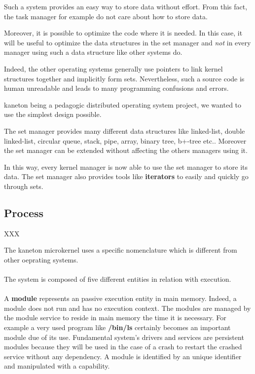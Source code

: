 \documentclass[10pt,a4wide]{article}
\begin{document}
\begin{multicols}{2}
Such a system provides an easy way to store data without effort. From this
fact, the task manager for example do not care about how to store data.

Moreover, it is possible to optimize the code where it is needed. In this
case, it will be useful to optimize the data structures in the set manager
and \textit{not} in every manager using such a data structure like
other systems do.

Indeed, the other operating systems generally use pointers to link kernel
structures together and implicitly form sets. Nevertheless, such a source code
is human unreadable and leads to many programming confusions and errors.

kaneton being a pedagogic distributed operating system project, we wanted
to use the simplest design possible.

The set manager provides many different data structures like linked-list,
double linked-list, circular queue, stack, pipe, array, binary tree, b+-tree
etc.. Moreover the set manager can be extended without affecting the others
managers using it.

In this way, every kernel manager is now able to use the set manager to
store its data. The set manager also provides tools like \textbf{iterators}
to easily and quickly go through sets.

\subsection{Process}

XXX

The kaneton microkernel uses a specific nomenclature which is different
from other oeprating systems.

\paragraph{}

The system is composed of five different entities in relation with execution.

\paragraph{}

A \textbf{module} represents an passive execution entity in main memory.
Indeed, a module does not run and has no execution context. The modules are
managed by the module service to reside in main memory the time it is
necessary. For example a very used program like \textbf{/bin/ls} certainly
becomes an important module due of its use. Fundamental system's drivers
and services are persistent modules because they will be used in the case
of a crash to restart the crashed service without any dependency.
A module is identified by an unique identifier and manipulated with a
capability.


\end{multicols}
\end{document}
